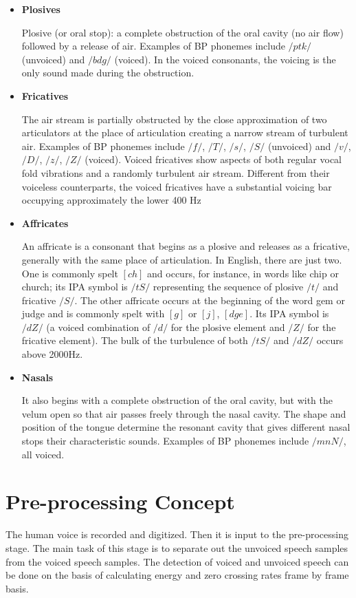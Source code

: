 \documentclass[12pt, a4paper, twoside]{report}
\begin{document}
\begin{itemize}
\item \textbf{Plosives} \par
Plosive (or oral stop): a complete obstruction of the oral cavity (no air flow) followed by a release of air. Examples of BP phonemes include $/p t k/$ (unvoiced) and $/b d g/$ (voiced). In the voiced consonants, the voicing is the only sound made during the obstruction.
\item \textbf{Fricatives} \par
The air stream is partially obstructed by the close approximation of two articulators at the place of articulation creating a narrow stream of turbulent air. Examples of BP phonemes include $/f/$, $/T/$, $/s/$, $/S/$ (unvoiced) and $/v/$, $/D/$, $/z/$, $/Z/$ (voiced). Voiced fricatives show aspects of both regular vocal fold vibrations and a randomly turbulent air stream. Different from their voiceless counterparts, the voiced fricatives have a substantial voicing bar occupying approximately the lower 400 Hz
\item \textbf{Affricates} \par
An affricate is a consonant that begins as a plosive and releases as a fricative, generally with the same place of articulation. In English, there are just two. One is commonly spelt $[ch]$ and occurs, for instance, in words like chip or church; its IPA symbol is $/tS/$ representing the sequence of plosive $/ t /$ and fricative $/ S /$. The other affricate occurs at the beginning of the word gem or judge and is commonly spelt with $[g]$ or $[j]$, $[dge]$. Its IPA symbol is $/dZ/$ (a voiced combination of $/ d /$ for the plosive element and $/ Z /$ for the fricative element). The bulk of the turbulence of both $/tS/$ and $/dZ/$ occurs above 2000Hz.
\item \textbf{Nasals} \par
It also begins with a complete obstruction of the oral cavity, but with the velum open so that air passes freely through the nasal cavity. The shape and position of the tongue determine the resonant cavity that gives different nasal stops their characteristic sounds. Examples of BP phonemes include $/m n N/$, all voiced.
\end{itemize}

\section{Pre-processing Concept}
The human voice is recorded and digitized. Then it is input to the pre-processing stage. The main task of this stage is to separate out the unvoiced speech samples from the voiced speech samples. The detection of voiced and unvoiced speech can be done on the basis of calculating energy and zero crossing rates frame by frame basis.
\end{document}
